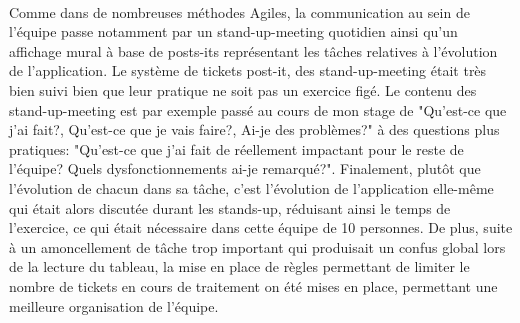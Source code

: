 \paragraph{}
Comme dans de nombreuses méthodes Agiles, la communication au sein de l'équipe passe notamment par un stand-up-meeting quotidien ainsi qu'un affichage mural à base de posts-its représentant les tâches relatives à l'évolution de l'application.
Le système de tickets post-it, des stand-up-meeting était très bien suivi bien que leur pratique ne soit pas un exercice figé.
Le contenu des stand-up-meeting est par exemple passé au cours de mon stage de "Qu'est-ce que j'ai fait?, Qu'est-ce que je vais faire?, Ai-je des problèmes?" à des questions plus pratiques: "Qu'est-ce que j'ai fait de réellement impactant pour le reste de l'équipe? Quels dysfonctionnements ai-je remarqué?".
Finalement, plutôt que l'évolution de chacun dans sa tâche, c'est l'évolution de l'application elle-même qui était alors discutée durant les stands-up, réduisant ainsi le temps de l'exercice, ce qui était nécessaire dans cette équipe de 10 personnes.
De plus, suite à un amoncellement de tâche trop important qui produisait un confus global lors de la lecture du tableau, la mise en place de règles permettant de limiter le nombre de tickets en cours de traitement on été mises en place, permettant une meilleure organisation de l'équipe.

